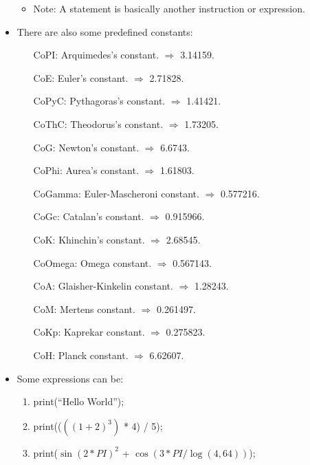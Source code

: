 \begin{itemize}
\begin{itemize}
\begin{itemize}
\begin{description}
                        \end{description}
                    \end{itemize}
                \item Note: A statement is basically another instruction or expression.
            \end{itemize}
        \newpage
        \item There are also some predefined constants:
            \begin{itemize}
                \item[CoPI:] Arquimedes's constant. $\Rightarrow$  3.14159.
                \item[CoE:] Euler's constant. $\Rightarrow$  2.71828.
                \item[CoPyC:] Pythagoras's constant. $\Rightarrow$  1.41421.
                \item[CoThC:] Theodorus's constant. $\Rightarrow$  1.73205.
                \item[CoG:] Newton's constant. $\Rightarrow$  6.6743.
                \item[CoPhi:] Aurea's constant. $\Rightarrow$  1.61803.
                \item[CoGamma:] Euler-Mascheroni constant. $\Rightarrow$  0.577216.
                \item[CoGc:] Catalan's constant. $\Rightarrow$  0.915966.
                \item[CoK:] Khinchin's constant. $\Rightarrow$  2.68545.
                \item[CoOmega:] Omega constant. $\Rightarrow$  0.567143.
                \item[CoA:] Glaisher-Kinkelin constant. $\Rightarrow$  1.28243.
                \item[CoM:] Mertens constant. $\Rightarrow$  0.261497.
                \item[CoKp:] Kaprekar constant. $\Rightarrow$  0.275823.
                \item[CoH:] Planck constant. $\Rightarrow$  6.62607.
            \end{itemize} 
        \item Some expressions can be:
            \begin{enumerate}
                \item print{(``Hello World'')};
                \item print{(($({(1 + 2)} ^ 3)$ * 4) / 5)};
                \item print{($\sin{(2 * PI)}^2$ + $\cos(3 * PI / \log(4, 64))$)};

\end{enumerate}
\end{itemize}
